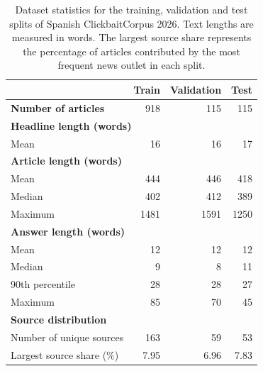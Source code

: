 \begin{table}[ht]
\centering
\begin{tabular}{lrrr}
\toprule
 & \textbf{Train} & \textbf{Validation} & \textbf{Test} \\
\midrule
\textbf{Number of articles} & 918 & 115 & 115 \\
\midrule
\multicolumn{4}{l}{\textbf{Headline length (words)}} \\
Mean & 16 & 16 & 17 \\
\midrule
\multicolumn{4}{l}{\textbf{Article length (words)}} \\
Mean & 444 & 446 & 418 \\
Median & 402 & 412 & 389 \\
Maximum & 1481 & 1591 & 1250 \\
\midrule
\multicolumn{4}{l}{\textbf{Answer length (words)}} \\
Mean & 12 & 12 & 12 \\
Median & 9 & 8 & 11 \\
90th percentile & 28 & 28 & 27 \\
Maximum & 85 & 70 & 45 \\
\midrule
\multicolumn{4}{l}{\textbf{Source distribution}} \\
Number of unique sources & 163 & 59 & 53 \\
Largest source share (\%) & 7.95 & 6.96 & 7.83 \\
\bottomrule
\end{tabular}
\caption{Dataset statistics for the training, validation and test splits of Spanish ClickbaitCorpus 2026. Text lengths are measured in words. The largest source share represents the percentage of articles contributed by the most frequent news outlet in each split.}
\label{tab:wordcounts}
\end{table}
